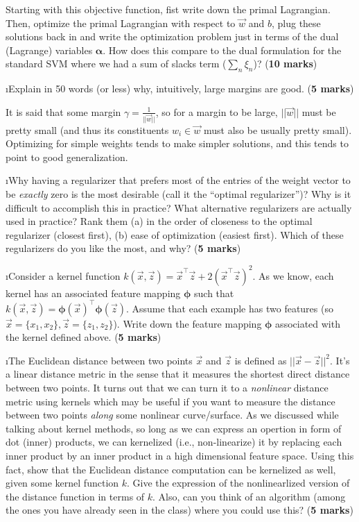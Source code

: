 \documentclass[fleqn]{article}
\begin{document}
Starting with this objective function, fist write down the primal Lagrangian. Then, 
optimize the primal Lagrangian with respect to $\vec{w}$ and $b$, plug these 
solutions back in and write the optimization problem just in terms of the dual 
(Lagrange) variables $\boldsymbol{\alpha}$. How does this compare to the dual formulation 
for the standard SVM where we had a sum of slacks term ($\sum_n \xi_n$)? (\textbf{10 marks})

\i Explain in 50 words (or less) why, intuitively, large margins are good. (\textbf{5 marks})

\begin{solution}
It is said that some margin $\gamma = \frac{1}{||\vec{w}||}$, so for a margin to be large, $||\vec{w}||$ must be pretty small (and thus its constituents $w_i \in \vec{w}$ must also be usually pretty small). Optimizing for simple weights tends to make simpler solutions, and this tends to point to good generalization.
\end{solution}

\i Why having a regularizer that prefers most of the entries of the weight
vector to be \textit{exactly} zero is the most desirable (call it the ``optimal
regularizer'')? Why is it difficult to accomplish this in practice? What 
alternative regularizers are actually used in practice? Rank them (a) in the order
of closeness to the optimal regularizer (closest first), (b) ease of optimization
(easiest first). Which of these regularizers do you like the most, and why?
(\textbf{5 marks})

\i Consider a kernel function $k(\vec{x},\vec{z}) = \vec{x}^\top \vec{z}
+ 2(\vec{x}^\top \vec{z})^2$. As we know, each kernel has an associated 
feature mapping $\boldsymbol{\phi}$ such that $k(\vec{x},\vec{z}) 
= \boldsymbol{\phi}(\vec{x})^\top \boldsymbol{\phi}(\vec{z})$. Assume that
each example has two features (so $\vec{x} = \{x_1,x_2\}, \vec{z} = \{z_1,z_2\}$). 
Write down the feature mapping $\boldsymbol{\phi}$ associated with 
the kernel defined above. (\textbf{5 marks})

\i The Euclidean distance between two points $\vec{x}$ and $\vec{z}$ is 
defined as  $||\vec{x}-\vec{z}||^2$. It's a linear distance
metric in the sense that it measures the shortest direct distance between
two points. It turns out that we can turn it to a \textit{nonlinear} distance metric
using kernels which may be useful if you want to measure the distance between
two points \textit{along} some nonlinear curve/surface. As we discussed 
while talking about kernel methods, so long as we can express an opertion in 
form of dot (inner) products, we can kernelized (i.e., non-linearize) it by
replacing each inner product by an inner product in a high dimensional feature
space. Using this fact, show that the Euclidean distance computation can be 
kernelized as well, given some kernel function $k$. Give the expression
of the nonlinearlized version of the distance function in terms of $k$. 
Also, can you think of an algorithm (among the ones you have already seen in the
class) where you could use this? (\textbf{5 marks})
\end{document}
